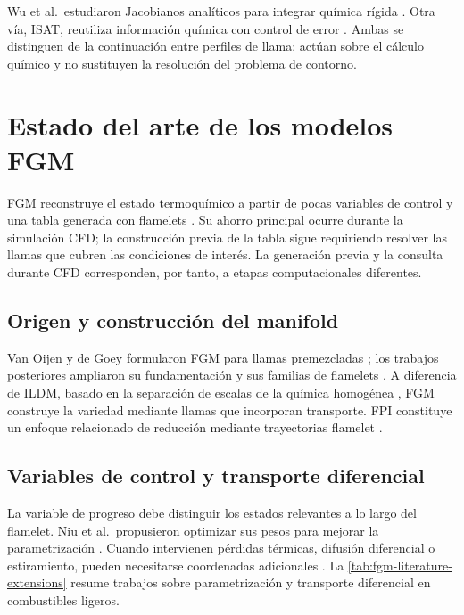 \documentclass[12pt,a4paper,twoside,openany]{book}
\begin{document}
Wu et al.\ estudiaron Jacobianos analíticos para integrar química rígida
\cite{Wu2023}. Otra vía, ISAT, reutiliza información química con control de
error \cite{Pope1997,YangPope1998}. Ambas se distinguen de la continuación
entre perfiles de llama: actúan sobre el cálculo químico y no sustituyen
la resolución del problema de contorno.

\section{Estado del arte de los modelos FGM}
\label{sec:fgm-state-of-art}

FGM reconstruye el estado termoquímico a partir de pocas variables de control
y una tabla generada con flamelets \cite{vanOijen2000,vanOijenReview2016}.
Su ahorro principal ocurre durante la simulación CFD; la construcción previa
de la tabla sigue requiriendo resolver las llamas que cubren las condiciones
de interés. La generación previa y la consulta durante CFD corresponden,
por tanto, a etapas computacionales diferentes.

\subsection{Origen y construcción del manifold}
\label{sec:fgm-origin}

Van Oijen y de Goey formularon FGM para llamas premezcladas
\cite{vanOijen2000}; los trabajos posteriores ampliaron su fundamentación
y sus familias de flamelets \cite{vanOijenThesis2002,vanOijenCounterflow2002}.
A diferencia de ILDM, basado en la separación de escalas de la química
homogénea \cite{MaasPope1992}, FGM construye la variedad mediante llamas que
incorporan transporte. FPI constituye un enfoque relacionado de reducción
mediante trayectorias flamelet \cite{Gicquel2000}.

\subsection{Variables de control y transporte diferencial}
\label{sec:fgm-parametrization}
\label{sec:fgm-h2-transport}

La variable de progreso debe distinguir los estados relevantes a lo largo
del flamelet. Niu et al.\ propusieron optimizar sus pesos para mejorar la
parametrización \cite{Niu2013}. Cuando intervienen pérdidas térmicas,
difusión diferencial o estiramiento, pueden necesitarse coordenadas
adicionales \cite{vanOijenReview2016}. La \cref{tab:fgm-literature-extensions}
resume trabajos sobre parametrización y transporte diferencial en combustibles
ligeros.
\end{document}
